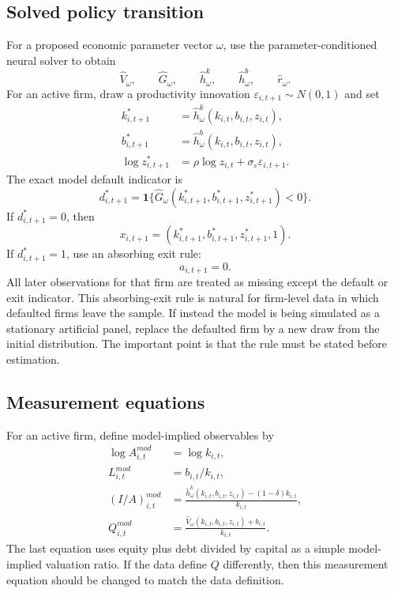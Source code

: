 \documentclass[11pt]{article}
\newcommand{\1}{\mathbf{1}}
\begin{document}
\subsection{Solved policy transition}

For a proposed economic parameter vector \(\omega\), use the
parameter-conditioned neural solver to obtain
\[
  \widehat V_\omega,\qquad
  \widehat G_\omega,\qquad
  \widehat h^k_\omega,\qquad
  \widehat h^b_\omega,\qquad
  \widehat r_\omega.
\]
For an active firm, draw a productivity innovation
\(\varepsilon_{i,t+1}\sim N(0,1)\) and set
\begin{align}
  k^*_{i,t+1}
  &=
  \widehat h^k_\omega(k_{i,t},b_{i,t},z_{i,t}),\\
  b^*_{i,t+1}
  &=
  \widehat h^b_\omega(k_{i,t},b_{i,t},z_{i,t}),\\
  \log z^*_{i,t+1}
  &=
  \rho\log z_{i,t}+\sigma_\varepsilon\varepsilon_{i,t+1}.
\end{align}
The exact model default indicator is
\begin{equation}
  d^*_{i,t+1}
  =
  \1\{\widehat G_\omega(k^*_{i,t+1},b^*_{i,t+1},z^*_{i,t+1})<0\}.
  \label{eq:full-ssm-exact-default}
\end{equation}
If \(d^*_{i,t+1}=0\), then
\[
  x_{i,t+1}=(k^*_{i,t+1},b^*_{i,t+1},z^*_{i,t+1},1).
\]
If \(d^*_{i,t+1}=1\), use an absorbing exit rule:
\[
  a_{i,t+1}=0.
\]
All later observations for that firm are treated as missing except the default
or exit indicator. This absorbing-exit rule is natural for firm-level data in
which defaulted firms leave the sample. If instead the model is being simulated
as a stationary artificial panel, replace the defaulted firm by a new draw from
the initial distribution. The important point is that the rule must be stated
before estimation.

\subsection{Measurement equations}

For an active firm, define model-implied observables by
\begin{align}
  \log A_{i,t}^{mod}
  &=
  \log k_{i,t},\\
  L_{i,t}^{mod}
  &=
  b_{i,t}/k_{i,t},\\
  (I/A)_{i,t}^{mod}
  &=
  \frac{\widehat h^k_\omega(k_{i,t},b_{i,t},z_{i,t})
  -(1-\delta)k_{i,t}}{k_{i,t}},\\
  Q_{i,t}^{mod}
  &=
  \frac{\widehat V_\omega(k_{i,t},b_{i,t},z_{i,t})+b_{i,t}}{k_{i,t}}.
\end{align}
The last equation uses equity plus debt divided by capital as a simple
model-implied valuation ratio. If the data define \(Q\) differently, then this
measurement equation should be changed to match the data definition.
\end{document}

